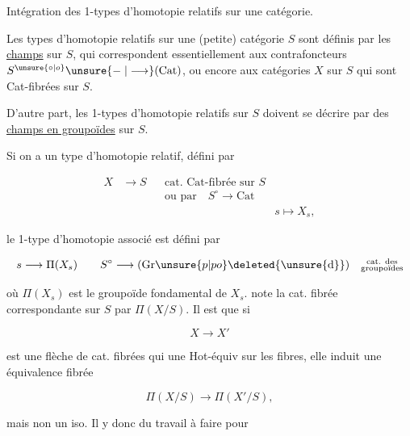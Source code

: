 Intégration des 1-types d'homotopie relatifs sur une catégorie.

Les types d'homotopie relatifs sur une (petite) catégorie $S$ sont définis par les \uline{champs}  sur $\hat S$, qui correspondent essentiellement aux contrafoncteurs $S^{\unsure{\circ|o}}\unsure{\mathrel{-}|\longrightarrow}(\mathrm{Cat})$, ou encore aux catégories $X$ sur $S$ qui sont Cat-fibrées sur $S$. 

D'autre part, les 1-types d'homotopie relatifs sur $S$ doivent se décrire par des \uline{champs en groupoïdes} sur $S$.

Si  on a un type d'homotopie relatif, défini par

\[
\begin{aligned}
X&\longrightarrow S & &\text{cat. Cat-fibrée sur }S\\
&&&\text{ou par}\quad S^\circ\longrightarrow\mathrm{Cat}\\
&&&& s\longmapsto X_s,
\end{aligned}
\]

le 1-type d'homotopie associé est défini par

\[
s\longrightarrow\Pi(X_s)\qquad S^\circ\longrightarrow(\mathrm{Gr}\unsure{p|po}\deleted{\unsure{\mathrm{d}}})
\quad\substack{\text{cat. des}\\\text{groupoïdes}}
\]

où $\Pi(X_s)$ est le groupoïde fondamental de $X_s$.   note la  cat. fibrée correspondante sur $S$ par $\boxed{\Pi(X/S).}$ Il est   que si

\[
X\longrightarrow X'
\]

est une flèche de cat. fibrées  qui  une Hot-équiv sur les fibres, elle induit une équivalence fibrée 

\[
\Pi(X/S)\longrightarrow\Pi(X'/S),
\]

mais non un iso. Il y  donc du travail à faire pour  


